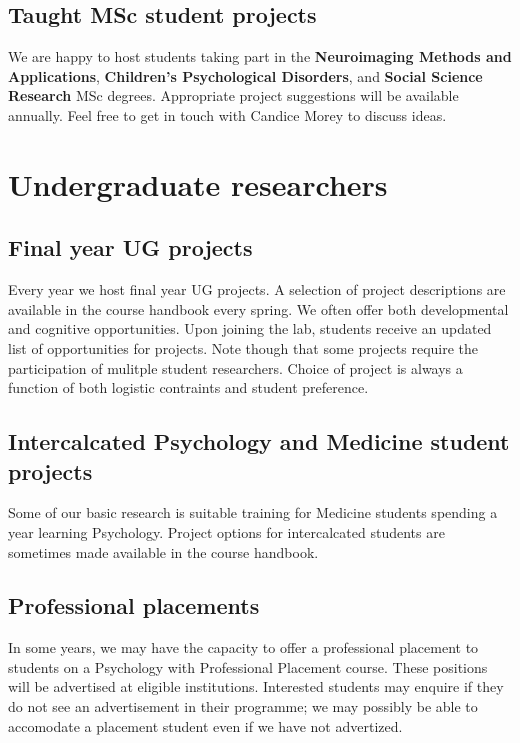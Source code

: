 \documentclass[12pt,]{book}
\theoremstyle{definition}
\theoremstyle{definition}
\theoremstyle{definition}
\theoremstyle{remark}
\begin{document}
\subsection{Taught MSc student
projects}\label{taught-msc-student-projects}

We are happy to host students taking part in the \textbf{Neuroimaging
Methods and Applications}, \textbf{Children's Psychological Disorders},
and \textbf{Social Science Research} MSc degrees. Appropriate project
suggestions will be available annually. Feel free to get in touch with
Candice Morey to discuss ideas.

\section{Undergraduate researchers}\label{undergraduate-researchers}

\subsection{Final year UG projects}\label{final-year-ug-projects}

Every year we host final year UG projects. A selection of project
descriptions are available in the course handbook every spring. We often
offer both developmental and cognitive opportunities. Upon joining the
lab, students receive an updated list of opportunities for projects.
Note though that some projects require the participation of mulitple
student researchers. Choice of project is always a function of both
logistic contraints and student preference.

\subsection{Intercalcated Psychology and Medicine student
projects}\label{intercalcated-psychology-and-medicine-student-projects}

Some of our basic research is suitable training for Medicine students
spending a year learning Psychology. Project options for intercalcated
students are sometimes made available in the course handbook.

\subsection{Professional placements}\label{professional-placements}

In some years, we may have the capacity to offer a professional
placement to students on a Psychology with Professional Placement
course. These positions will be advertised at eligible institutions.
Interested students may enquire if they do not see an advertisement in
their programme; we may possibly be able to accomodate a placement
student even if we have not advertized.
\end{document}

